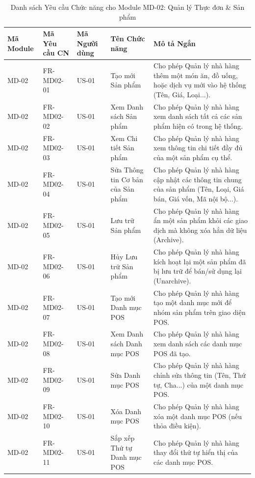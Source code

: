 \begin{longtable}{|m{2cm}|m{2.5cm}|m{2cm}|m{4.5cm}|m{4cm}|}
\caption{Danh sách Yêu cầu Chức năng cho Module MD-02: Quản lý Thực đơn \& Sản phẩm} \label{tab:fr_md02_revised} \\
\hline
\textbf{Mã Module} & \textbf{Mã Yêu cầu CN} & \textbf{Mã Người dùng} & \textbf{Tên Chức năng} & \textbf{Mô tả Ngắn} \\
\hline
\endhead %

\hline
\endfoot %

\hline
\endlastfoot %

MD-02 & FR-MD02-01 & US-01 & Tạo mới Sản phẩm & Cho phép Quản lý nhà hàng thêm một món ăn, đồ uống, hoặc dịch vụ mới vào hệ thống (Tên, Giá, Loại...). \\
\hline
MD-02 & FR-MD02-02 & US-01 & Xem Danh sách Sản phẩm & Cho phép Quản lý nhà hàng xem danh sách tất cả các sản phẩm hiện có trong hệ thống. \\
\hline
MD-02 & FR-MD02-03 & US-01 & Xem Chi tiết Sản phẩm & Cho phép Quản lý nhà hàng xem thông tin chi tiết đầy đủ của một sản phẩm cụ thể. \\
\hline
MD-02 & FR-MD02-04 & US-01 & Sửa Thông tin Cơ bản của Sản phẩm & Cho phép Quản lý nhà hàng cập nhật các thông tin chung của sản phẩm (Tên, Loại, Giá bán, Giá vốn, Mã nội bộ...). \\
\hline
MD-02 & FR-MD02-05 & US-01 & Lưu trữ Sản phẩm & Cho phép Quản lý nhà hàng ẩn một sản phẩm khỏi các giao dịch mà không xóa hẳn dữ liệu (Archive). \\
\hline
MD-02 & FR-MD02-06 & US-01 & Hủy Lưu trữ Sản phẩm & Cho phép Quản lý nhà hàng kích hoạt lại một sản phẩm đã bị lưu trữ để bán/sử dụng lại (Unarchive). \\
\hline
MD-02 & FR-MD02-07 & US-01 & Tạo mới Danh mục POS & Cho phép Quản lý nhà hàng tạo một danh mục mới để nhóm sản phẩm trên giao diện POS. \\
\hline
MD-02 & FR-MD02-08 & US-01 & Xem Danh sách Danh mục POS & Cho phép Quản lý nhà hàng xem danh sách các danh mục POS đã tạo. \\
\hline
MD-02 & FR-MD02-09 & US-01 & Sửa Danh mục POS & Cho phép Quản lý nhà hàng chỉnh sửa thông tin (Tên, Thứ tự, Cha...) của một danh mục POS. \\
\hline
MD-02 & FR-MD02-10 & US-01 & Xóa Danh mục POS & Cho phép Quản lý nhà hàng xóa một danh mục POS (nếu thỏa điều kiện). \\
\hline
MD-02 & FR-MD02-11 & US-01 & Sắp xếp Thứ tự Danh mục POS & Cho phép Quản lý nhà hàng thay đổi thứ tự hiển thị của các danh mục POS. \\

\end{longtable}
